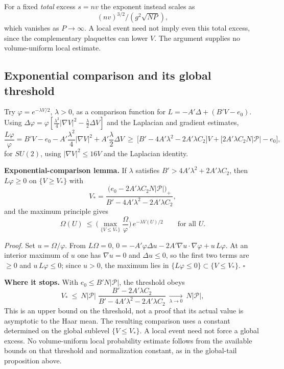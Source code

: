 \documentclass[11pt,a4paper]{article}
\begin{document}
For a fixed \emph{total} excess \(s=nv\) the exponent instead scales as
\[(nv)^{3/2}/(g^2\sqrt{NP}),\] which vanishes as \(P\to\infty\). A local
event need not imply even this total excess, since the complementary
plaquettes can lower \(V\). The argument supplies no volume-uniform
local estimate.

\hypertarget{exponential-comparison-and-its-global-threshold}{%
\subsection{Exponential comparison and its global
threshold}\label{exponential-comparison-and-its-global-threshold}}

Try \(\varphi=e^{-\lambda V/2}\), \(\lambda>0\), as a comparison
function for \(L=-A'\Delta+(B'V-e_0)\). Using
\(\Delta\varphi=\varphi[\tfrac{\lambda^2}4|\nabla V|^2-\tfrac\lambda2\Delta V]\)
and the Laplacian and gradient estimates, \[\frac{L\varphi}{\varphi}
=B'V-e_0-A'\frac{\lambda^2}4|\nabla V|^2+A'\frac\lambda2\Delta V
\ \ge\ \Big[B'-4A'\lambda^2-2A'\lambda C_2\Big]V
+\Big[2A'\lambda C_2N|\mathcal P|-e_0\Big],\] for \(SU(2)\), using
\(|\nabla V|^2\le16V\) and the Laplacian identity.

\textbf{Exponential-comparison lemma.} If \(\lambda\) satisfies
\(B'>4A'\lambda^2+2A'\lambda C_2\), then \(L\varphi\ge0\) on
\(\{V\ge V_*\}\) with
\[V_*=\frac{\big(e_0-2A'\lambda C_2N|\mathcal P|\big)_+}{B'-4A'\lambda^2-2A'\lambda C_2},\]
and the maximum principle gives
\[\Omega(U)\ \le\ \Big(\max_{\{V\le V_*\}}\frac{\Omega}{\varphi}\Big)\,e^{-\lambda V(U)/2}
\qquad\text{for all }U .\]

\emph{Proof.} Set \(u=\Omega/\varphi\). From \(L\Omega=0\),
\(0=-A'\varphi\Delta u-2A'\nabla u\!\cdot\!\nabla\varphi+u\,L\varphi\).
At an interior maximum of \(u\) one has \(\nabla u=0\) and
\(\Delta u\le0\), so the first two terms are \(\ge0\) and
\(u\,L\varphi\le0\); since \(u>0\), the maximum lies in
\(\{L\varphi\le0\}\subset\{V\le V_*\}\). \(\square\)

\textbf{Where it stops.} With \(e_0\le B'N|\mathcal P|\), the threshold
obeys
\[V_*\ \le\ N|\mathcal P|\;\frac{B'-2A'\lambda C_2}{B'-4A'\lambda^2-2A'\lambda C_2}
\ \xrightarrow[\lambda\to0]{}\ N|\mathcal P| ,\] This is an upper bound
on the threshold, not a proof that its actual value is asymptotic to the
Haar mean. The resulting comparison uses a constant determined on the
global sublevel \(\{V\le V_*\}\). A local event need not force a global
excess. No volume-uniform local probability estimate follows from the
available bounds on that threshold and normalization constant, as in the
global-tail proposition above.
\end{document}
